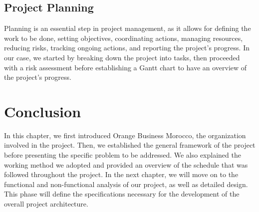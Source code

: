 \subsection{Project Planning}
Planning is an essential step in project management, as it allows for defining the work to be done, setting objectives, coordinating actions, managing resources, reducing risks, tracking ongoing actions, and reporting the project's progress. In our case, we started by breaking down the project into tasks, then proceeded with a risk assessment before establishing a Gantt chart to have an overview of the project's progress.

\section{Conclusion}
In this chapter, we first introduced Orange Business Morocco, the organization involved in the project. Then, we established the general framework of the project before presenting the specific problem to be addressed. We also explained the working method we adopted and provided an overview of the schedule that was followed throughout the project. In the next chapter, we will move on to the functional and non-functional analysis of our project, as well as detailed design. This phase will define the specifications necessary for the development of the overall project architecture.